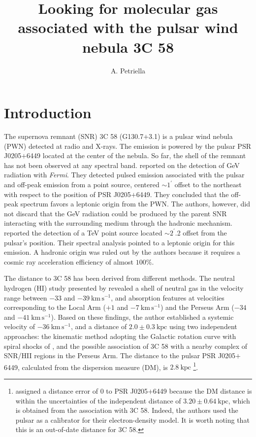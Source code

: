 \documentclass[baaa]{baaa}
\title{Looking for molecular gas associated with the pulsar wind nebula 3C 58}
\author{
A. Petriella\inst{1}
}
\institute{
Instituto de Astronom{\'\i}a y F{\'\i}sica del Espacio, CONICET--UBA, Argentina
}
\begin{document}
\maketitle
\section{Introduction}
\label{S_intro}

The supernova remnant (SNR) 3C 58 (G130.7$+$3.1) is a pulsar wind nebula (PWN) detected at radio and X-rays. The emission is powered by the pulsar PSR J0205$+$6449 located at the center of the nebula.
So far, the shell of the remnant has not been observed at any spectral band. 
\cite{abdo13} reported on the detection of GeV radiation with {\it Fermi}. They detected pulsed emission associated with the pulsar and off-peak emission from a point source, centered $\sim 1^{\prime}$ offset to the northeast with respect to the position of PSR J0205$+$6449. They concluded that the off-peak spectrum favors a leptonic origin from the PWN. The authors, however, did not discard that the GeV radiation could be produced by the parent SNR interacting with the surrounding medium through the hadronic mechanism. \cite{magic14} reported the detection of a TeV point source located $\sim 2^{\prime}$.2 offset from the pulsar’s position. Their spectral analysis pointed to a leptonic origin for this emission. A hadronic origin was ruled out by the authors because it requires a cosmic ray acceleration efficiency of almost $100\%$.  

The distance to 3C 58 has been derived from different methods. The neutral hydrogen (HI) study presented by \cite{kothes13} revealed a shell of neutral gas in the velocity range between $-33$ and $-39~\mathrm{km\,s^{-1}}$, and absorption features at velocities corresponding to the Local Arm ($+1$ and $-7~\mathrm{km\,s^{-1}}$) and the Perseus Arm ($-34$ and $-41~\mathrm{km\,s^{-1}}$). Based on these findings, the author established a systemic velocity of $-36~\mathrm{km\,s^{-1}}$, and a distance of $2.0\pm0.3~\mathrm{kpc}$ using two independent approaches: the kinematic method adopting the Galactic rotation curve with spiral shocks of \cite{foster06}, and the possible association of 3C 58 with a nearby complex of SNR/HII regions in the Perseus Arm. The distance to the pulsar PSR J0205$+$6449, calculated from the dispersion measure (DM), is $2.8~\mathrm{kpc}$  \citep{yao17}\footnote{\cite{yao17} assigned a distance error of 0 to PSR J0205$+$6449 because the DM distance is within the uncertainties of the independent distance of $3.20\pm0.64~\mathrm{kpc}$, which is obtained from the association with 3C 58. Indeed, the authors used the pulsar as a calibrator for their electron-density model. It is worth noting that this is an out-of-date distance for 3C 58.}.
\end{document}
